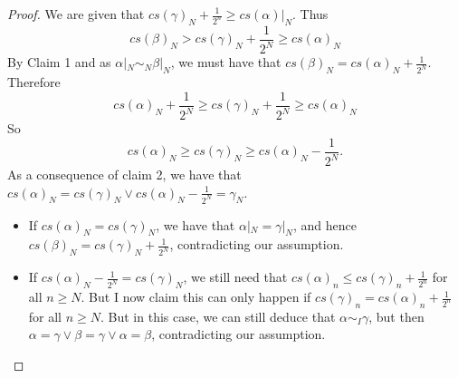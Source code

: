 \begin{proof}
  We are given that 
  $cs(\gamma)_N + \frac{1}{2^n}\geq cs(\alpha)|_N $. 
  Thus $$cs(\beta)_N > cs(\gamma)_N + \frac{1}{2^N} \geq cs(\alpha)_N$$
  By Claim 1 and as $\alpha|_N\sim_N\beta|_N$, we must have that  
  $cs(\beta)_N = cs(\alpha)_N +\frac{1}{2^N} $. 
  Therefore 
      $$
      cs(\alpha)_N+\frac{1}{2^N} \geq cs(\gamma)_N + \frac{1}{2^N} \geq cs(\alpha)_N
      $$
      So $$cs(\alpha)_N \geq cs(\gamma)_N\geq cs(\alpha)_N -\frac{1}{2^N}.$$
      As a consequence of claim 2, we have that 
      $cs(\alpha)_N = cs(\gamma)_N \vee cs(\alpha)_N -\frac{1}{2^N} = \gamma_N$. 
      \begin{itemize}
        \item If $cs(\alpha)_N = cs(\gamma)_N$, we have that 
          $\alpha|_N = \gamma|_N$, and hence $cs(\beta)_N = cs(\gamma)_N + \frac{1}{2^N}$, 
          contradicting our assumption. 
        \item 
          If $cs(\alpha)_N -\frac{1}{2^N} = cs(\gamma)_N$, we still need that 
          $cs(\alpha)_n \leq cs(\gamma)_n + \frac{1}{2^n}$ for all $n\geq N$. 
          But I now claim this can only happen if
          $cs(\gamma)_n = cs(\alpha)_n + \frac{1}{2^n}$ for all $n\geq N$. 
          But in this case, we can still deduce that 
          $\alpha\sim_I \gamma$, but then $\alpha = \gamma \vee \beta = \gamma \vee \alpha = \beta$, 
          contradicting our assumption. 
      \end{itemize}






\end{proof}
